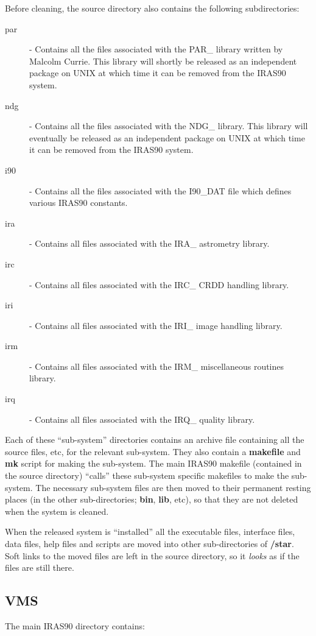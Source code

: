 Before cleaning, the source directory also contains the following
subdirectories:
\begin{description}
\item [par] - Contains all the files associated with the {\small PAR\_} library
written by Malcolm Currie. This library will shortly be released as an
independent package on {\small UNIX} at which time it can be removed from the
{\small IRAS90} system.
\item [ndg] - Contains all the files associated with the {\small NDG\_} library.
This library will eventually be released as an independent package on {\small
UNIX} at which time it can be removed from the {\small IRAS90} system.
\item [i90] - Contains all the files associated with the {\small I90\_DAT} file
which defines various {\small IRAS90} constants.
\item [ira] - Contains all files associated with the {\small IRA\_} astrometry
library.
\item [irc] - Contains all files associated with the {\small IRC\_ CRDD} handling
library.
\item [iri] - Contains all files associated with the {\small IRI\_} image handling
library.
\item [irm] - Contains all files associated with the {\small IRM\_} miscellaneous
routines library.
\item [irq] - Contains all files associated with the {\small IRQ\_} quality
library.
\end{description}

Each of these ``sub-system'' directories contains an archive file containing all the source
files, etc, for the relevant sub-system. They also contain a {\bf makefile} and
{\bf mk} script for making the sub-system. The main {\small IRAS90} makefile
(contained in the source directory)
``calls'' these sub-system specific makefiles to make the sub-system. The
necessary sub-system files are then moved to their permanent resting places
(in the other sub-directories; {\bf bin}, {\bf lib}, etc), so that they are not
deleted when the system is cleaned.

When the released system is ``installed'' all the executable files, interface
files, data files, help files and scripts are moved into other sub-directories
of {\bf /star}. Soft links to the moved files are left in the source directory,
so it {\em looks} as if the files are still there.


\subsection{VMS}
The main {\small IRAS90} directory contains:

